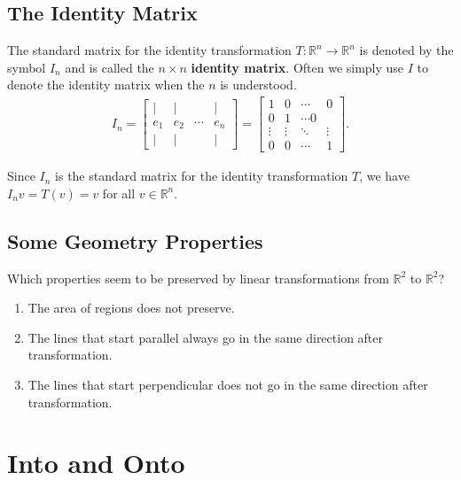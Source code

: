 \documentclass{package/notes}
\begin{document}
\subsection{The Identity Matrix}
\begin{definition}

The standard matrix for the identity transformation $T:\mathbb{R}^n\rightarrow \mathbb{R}^n$ is denoted by the symbol $I_n$ and is called the $n\times n$ \textbf{identity matrix}. Often we simply use $I$ to denote the identity matrix when the $n$ is understood.
\begin{align*}
    I_ n = \left[ \begin{array}{cccc} | &  | & &  | \\ e_1 &  e_2 &  \cdots &  e_ n \\ | &  | & &  | \end{array} \right] = \left[\begin{array}{cccc} 1 &  0 & \cdots &  0 \\ 0 &  1 &  \cdots 0 \\ \vdots &  \vdots &  \ddots &  \vdots \\ 0 &  0 &  \cdots &  1 \end{array} \right].
\end{align*}
\end{definition}

Since $I_n$ is the standard matrix for the identity transformation $T$, we have $I_nv=T(v)=v$ for all $v\in \mathbb{R}^n$.

\subsection{Some Geometry Properties}

Which properties seem to be preserved by linear transformations from $\mathbb{R}^2$ to $\mathbb{R}^2$?
\begin{enumerate}
    \item The area of regions does not preserve.
    \item The lines that start parallel always go in the same direction after transformation.
    \item The lines that start perpendicular does not go in the same direction after transformation.
\end{enumerate}


\section{Into and Onto}
\end{document}

